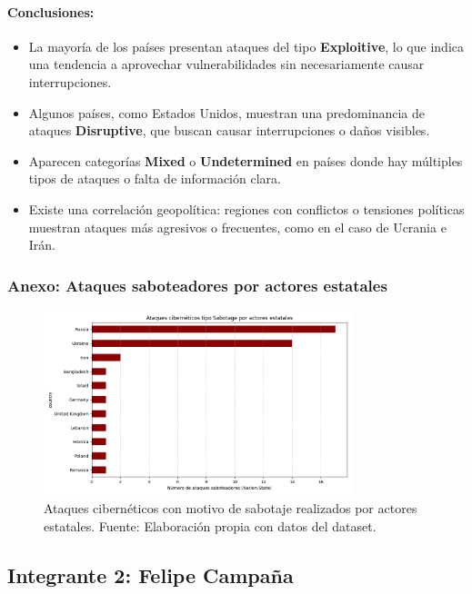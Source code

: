 \documentclass[12pt, a4paper]{article}
\begin{document}
\paragraph{Conclusiones:}
\begin{itemize}
    \item La mayoría de los países presentan ataques del tipo \textbf{Exploitive}, lo que indica una tendencia a aprovechar vulnerabilidades sin necesariamente causar interrupciones.
    \item Algunos países, como Estados Unidos, muestran una predominancia de ataques \textbf{Disruptive}, que buscan causar interrupciones o daños visibles.
    \item Aparecen categorías \textbf{Mixed} o \textbf{Undetermined} en países donde hay múltiples tipos de ataques o falta de información clara.
    \item Existe una correlación geopolítica: regiones con conflictos o tensiones políticas muestran ataques más agresivos o frecuentes, como en el caso de Ucrania e Irán.
\end{itemize}
\subsubsection*{Anexo: Ataques saboteadores por actores estatales}
\begin{figure}[H]
    \centering
    \includegraphics[width=0.8\textwidth]{images/sabotage_state.png}
    \caption{Ataques cibernéticos con motivo de sabotaje realizados por actores estatales. Fuente: Elaboración propia con datos del dataset.}
\end{figure}



\newpage
\subsection*{Integrante 2: Felipe Campaña}
\end{document}
